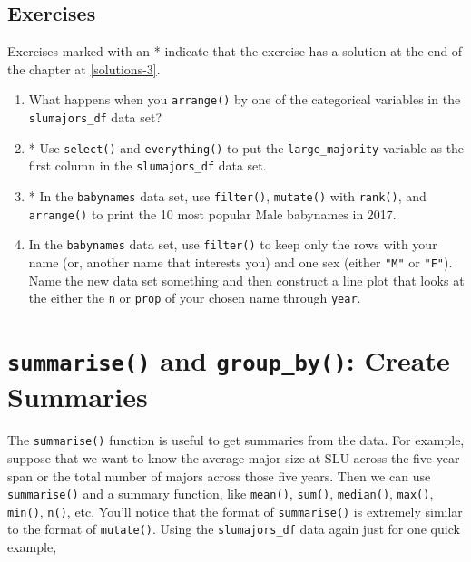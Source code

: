 \documentclass[
]{book}
\begin{document}
\hypertarget{exercise-3-2}{%
\subsection{Exercises}\label{exercise-3-2}}

Exercises marked with an * indicate that the exercise has a solution at the end of the chapter at \ref{solutions-3}.

\begin{enumerate}
\def\labelenumi{\arabic{enumi}.}
\item
  What happens when you \texttt{arrange()} by one of the categorical variables in the \texttt{slumajors\_df} data set?
\item
  * Use \texttt{select()} and \texttt{everything()} to put the \texttt{large\_majority} variable as the first column in the \texttt{slumajors\_df} data set.
\item
  * In the \texttt{babynames} data set, use \texttt{filter()}, \texttt{mutate()} with \texttt{rank()}, and \texttt{arrange()} to print the 10 most popular Male babynames in 2017.
\item
  In the \texttt{babynames} data set, use \texttt{filter()} to keep only the rows with your name (or, another name that interests you) and one sex (either \texttt{"M"} or \texttt{"F"}). Name the new data set something and then construct a line plot that looks at the either the \texttt{n} or \texttt{prop} of your chosen name through \texttt{year}.
\end{enumerate}

\hypertarget{summarise-and-group_by-create-summaries}{%
\section{\texorpdfstring{\texttt{summarise()} and \texttt{group\_by()}: Create Summaries}{summarise() and group\_by(): Create Summaries}}\label{summarise-and-group_by-create-summaries}}

The \texttt{summarise()} function is useful to get summaries from the data. For example, suppose that we want to know the average major size at SLU across the five year span or the total number of majors across those five years. Then we can use \texttt{summarise()} and a summary function, like \texttt{mean()}, \texttt{sum()}, \texttt{median()}, \texttt{max()}, \texttt{min()}, \texttt{n()}, etc. You'll notice that the format of \texttt{summarise()} is extremely similar to the format of \texttt{mutate()}. Using the \texttt{slumajors\_df} data again just for one quick example,
\end{document}
